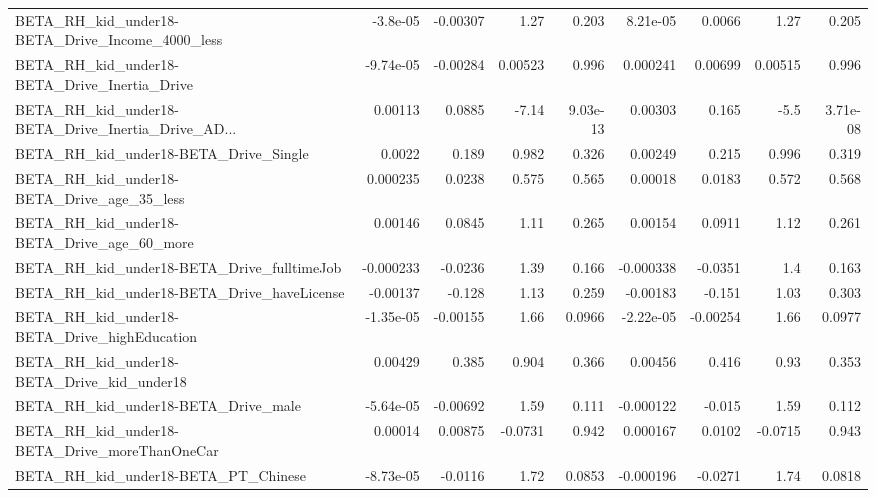 \begin{tabular}{lrrrrrrrr}
BETA\_RH\_kid\_under18-BETA\_Drive\_Income\_4000\_less    &    -3.8e-05 &     -0.00307 &     1.27 &    0.203 &   8.21e-05 &      0.0066 &         1.27 &         0.205 \\
BETA\_RH\_kid\_under18-BETA\_Drive\_Inertia\_Drive       &   -9.74e-05 &     -0.00284 &  0.00523 &    0.996 &   0.000241 &     0.00699 &      0.00515 &         0.996 \\
BETA\_RH\_kid\_under18-BETA\_Drive\_Inertia\_Drive\_AD... &     0.00113 &       0.0885 &    -7.14 & 9.03e-13 &    0.00303 &       0.165 &         -5.5 &      3.71e-08 \\
BETA\_RH\_kid\_under18-BETA\_Drive\_Single              &      0.0022 &        0.189 &    0.982 &    0.326 &    0.00249 &       0.215 &        0.996 &         0.319 \\
BETA\_RH\_kid\_under18-BETA\_Drive\_age\_35\_less         &    0.000235 &       0.0238 &    0.575 &    0.565 &    0.00018 &      0.0183 &        0.572 &         0.568 \\
BETA\_RH\_kid\_under18-BETA\_Drive\_age\_60\_more         &     0.00146 &       0.0845 &     1.11 &    0.265 &    0.00154 &      0.0911 &         1.12 &         0.261 \\
BETA\_RH\_kid\_under18-BETA\_Drive\_fulltimeJob         &   -0.000233 &      -0.0236 &     1.39 &    0.166 &  -0.000338 &     -0.0351 &          1.4 &         0.163 \\
BETA\_RH\_kid\_under18-BETA\_Drive\_haveLicense         &    -0.00137 &       -0.128 &     1.13 &    0.259 &   -0.00183 &      -0.151 &         1.03 &         0.303 \\
BETA\_RH\_kid\_under18-BETA\_Drive\_highEducation       &   -1.35e-05 &     -0.00155 &     1.66 &   0.0966 &  -2.22e-05 &    -0.00254 &         1.66 &        0.0977 \\
BETA\_RH\_kid\_under18-BETA\_Drive\_kid\_under18         &     0.00429 &        0.385 &    0.904 &    0.366 &    0.00456 &       0.416 &         0.93 &         0.353 \\
BETA\_RH\_kid\_under18-BETA\_Drive\_male                &   -5.64e-05 &     -0.00692 &     1.59 &    0.111 &  -0.000122 &      -0.015 &         1.59 &         0.112 \\
BETA\_RH\_kid\_under18-BETA\_Drive\_moreThanOneCar      &     0.00014 &      0.00875 &  -0.0731 &    0.942 &   0.000167 &      0.0102 &      -0.0715 &         0.943 \\
BETA\_RH\_kid\_under18-BETA\_PT\_Chinese                &   -8.73e-05 &      -0.0116 &     1.72 &   0.0853 &  -0.000196 &     -0.0271 &         1.74 &        0.0818 \\

\end{tabular}
